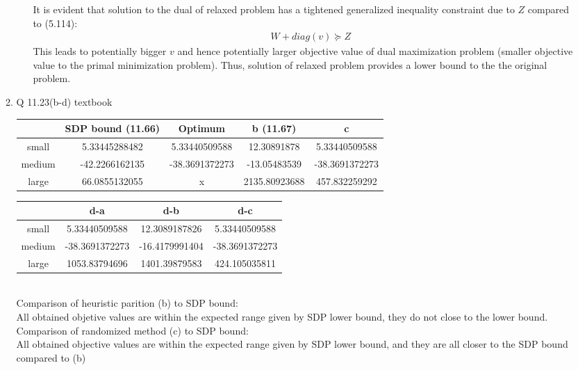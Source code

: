 \documentclass[12pt,letter]{article}
\begin{document}
\begin{enumerate}
\begin{enumerate}
\begin{enumerate}
      It is evident that solution to the dual of relaxed problem has a tightened generalized inequality constraint due to $Z$ compared to (5.114):
      \begin{align*}
        &W + diag(v) \succeq Z
      \end{align*}
      This leads to potentially bigger $v$ and hence potentially larger objective value of dual maximization problem (smaller objective value to the primal minimization problem). Thus, solution of relaxed problem provides a lower bound to the the original problem.\\
    \end{enumerate}
    
  \pagebreak
  
\item Q 11.23(b-d) textbook\\
  
  \begin{tabular}{|c|c|c|c|c|}\hline
          & SDP bound (11.66)& Optimum & b (11.67)& c \\ \hline
    small & 5.33445288482 & 5.33440509588 & 12.30891878 & 5.33440509588\\ \hline
    medium & -42.2266162135 & -38.3691372273  & -13.05483539 & -38.3691372273\\ \hline
    large & 66.0855132055 & x & 2135.80923688 & 457.832259292\\ \hline
  \end{tabular}

    \begin{tabular}{|c|c|c|c|}\hline
      & d-a & d-b & d-c\\ \hline
      small & 5.33440509588 & 12.3089187826 &5.33440509588\\ \hline
      medium & -38.3691372273& -16.4179991404 &-38.3691372273 \\ \hline
      large & 1053.83794696& 1401.39879583 &424.105035811\\ \hline
    \end{tabular}\\

    Comparison of heuristic parition (b) to SDP bound:\\
    All obtained objetive values are within the expected range given by SDP lower bound, they do not close to the lower bound.\\

    Comparison of randomized method (c) to SDP bound:\\
    All obtained objective values are within the expected range given by SDP lower bound, and they are all closer to the SDP bound compared to (b)\\


\end{enumerate}
\end{enumerate}
\end{document}
